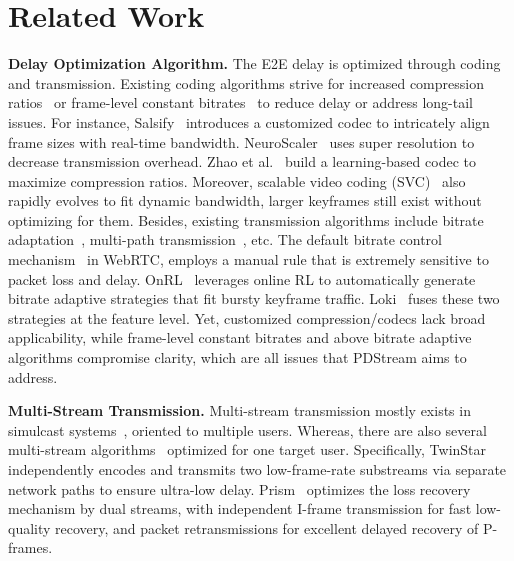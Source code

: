 \section{Related Work}
\label{sec:related}

\textbf{Delay Optimization Algorithm.} The E2E delay is optimized through coding and transmission. Existing coding algorithms strive for increased compression ratios~\cite{kim2020neural,yeo2022neuroscaler,zhao2022learning,wang2021enabling,xiao2022dnn} or frame-level constant bitrates~\cite{fouladi2018salsify,hyun2020frame,zhao2021cbren} to reduce delay or address long-tail issues. For instance, Salsify~\cite{fouladi2018salsify} introduces a customized codec to intricately align frame sizes with real-time bandwidth. NeuroScaler~\cite{yeo2022neuroscaler} uses super resolution to decrease transmission overhead. Zhao et al.~\cite{zhao2022learning} build a learning-based codec to maximize compression ratios. Moreover, scalable video coding (SVC)~\cite{SVC} also rapidly evolves to fit dynamic bandwidth, larger keyframes still exist without optimizing for them.
Besides, existing transmission algorithms include bitrate adaptation~\cite{zhang2020onrl,zhang2021loki,carlucci2016analysis,huang2022learned,li2023mamba,zhang2023intelligent,kan2022improving}, multi-path transmission~\cite{wang2023twinstar,li2022livenet}, etc. The default bitrate control mechanism~\cite{carlucci2016analysis} in WebRTC, employs a manual rule that is extremely sensitive to packet loss and delay. OnRL~\cite{zhang2020onrl} leverages online RL to automatically generate bitrate adaptive strategies that fit bursty keyframe traffic. Loki~\cite{zhang2021loki} fuses these two strategies at the feature level. %
Yet, customized compression/codecs lack broad applicability, while frame-level constant bitrates and above bitrate adaptive algorithms compromise clarity, which are all issues that PDStream aims to address.

\textbf{Multi-Stream Transmission.} Multi-stream transmission mostly exists in simulcast systems~\cite{lin2022gso,wang2021multilive}, oriented to multiple users. Whereas, there are also several multi-stream algorithms~\cite{wang2023twinstar,ray2022prism} optimized for one target user. Specifically, TwinStar~\cite{wang2023twinstar} independently encodes and transmits two low-frame-rate substreams via separate network paths to ensure ultra-low delay. Prism~\cite{ray2022prism} optimizes the loss recovery mechanism by dual streams, with independent I-frame transmission for fast low-quality recovery, and packet retransmissions for excellent delayed recovery of P-frames.

